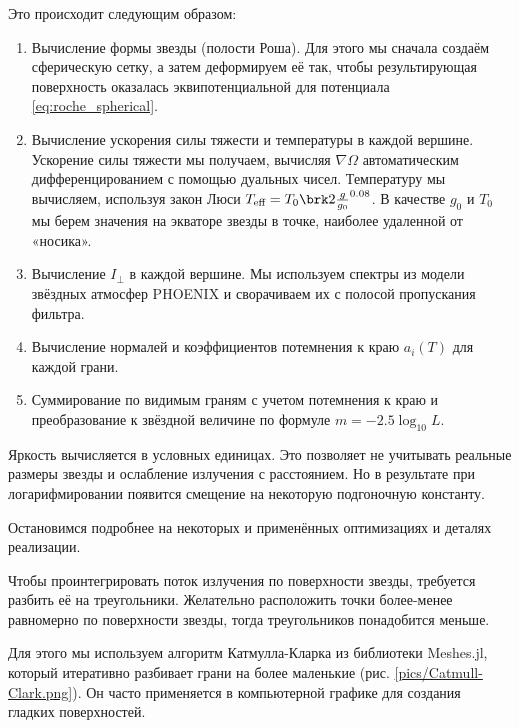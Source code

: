 Это происходит следующим образом:
\begin{enumerate}
    \item Вычисление формы звезды (полости Роша). Для этого мы сначала создаём сферическую сетку, а затем деформируем её так, чтобы результирующая поверхность оказалась эквипотенциальной для потенциала \eqref{eq:roche_spherical}.
    \item Вычисление ускорения силы тяжести и температуры в каждой вершине. Ускорение силы тяжести мы получаем, вычисляя $\nabla \Omega$ автоматическим дифференцированием с помощью дуальных чисел. Температуру мы вычисляем, используя закон Люси $T_\text{eff} = T_0 \brk2{\frac{g}{g_0}}^{0.08}$. В качестве $g_0$ и $T_0$ мы берем значения на экваторе звезды в точке, наиболее удаленной от «носика».
    \item Вычисление $I_\perp$ в каждой вершине. Мы используем спектры из модели звёздных атмосфер PHOENIX и сворачиваем их с полосой пропускания фильтра.
    \item Вычисление нормалей и коэффициентов потемнения к краю $a_i(T)$ для каждой грани.
    \item Суммирование по видимым граням с учетом потемнения к краю и преобразование к звёздной величине по формуле $m = -2.5 \log_{10} L$.
\end{enumerate}

Яркость вычисляется в условных единицах. Это позволяет не учитывать реальные размеры звезды и ослабление излучения с расстоянием. Но в результате при логарифмировании появится смещение на некоторую подгоночную константу.

Остановимся подробнее на некоторых и применённых оптимизациях и деталях реализации.


Чтобы проинтегрировать поток излучения по поверхности звезды, требуется разбить её на треугольники. Желательно расположить точки более-менее равномерно по поверхности звезды, тогда треугольников понадобится меньше.

Для этого мы используем алгоритм Катмулла-Кларка из библиотеки Meshes.jl, который итеративно разбивает грани на более маленькие (рис. \ref{pics/Catmull-Clark.png}). Он часто применяется в компьютерной графике для создания гладких поверхностей.


